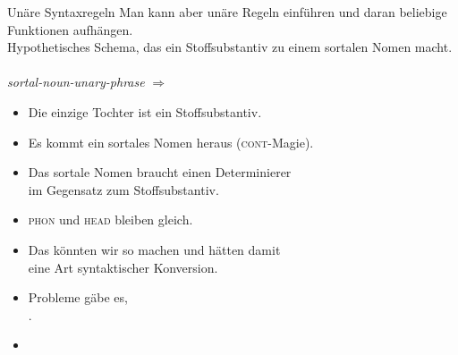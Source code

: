 \begin{frame}
  {Unäre Syntaxregeln}
  \onslide<+->
  \onslide<+->
  Man kann aber \alert{unäre Regeln} einführen und daran beliebige Funktionen aufhängen.\\
  Hypothetisches Schema, das ein Stoffsubstantiv zu einem sortalen Nomen macht.\\
  \\
  \onslide<+->
  \Zeile
  \textit{sortal-noun-unary-phrase} $\Rightarrow$\\
  \Viertelzeile
  \begin{minipage}{0.425\textwidth}
  \end{minipage}%
  \onslide<+->%
  \begin{minipage}{0.55\textwidth}
    \begin{itemize}[<+->]\footnotesize
      \item Die einzige Tochter ist ein Stoffsubstantiv.
      \item Es kommt ein sortales Nomen heraus (\textsc{cont}-Magie).
      \item Das sortale Nomen braucht einen Determinierer\\
        im Gegensatz zum Stoffsubstantiv.
      \item \textsc{phon} und \textsc{head} bleiben gleich.
        \Halbzeile
      \item Das könnten wir so machen und hätten damit\\
        eine Art \alert{syntaktischer Konversion}.
      \item Probleme gäbe es, \\
        .
      \item {}
    \end{itemize}
  \end{minipage}
\end{frame}

